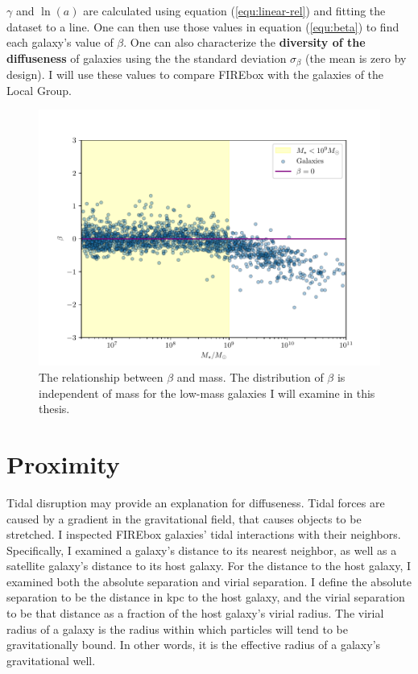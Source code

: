 $\gamma$ and $\ln(a)$ are calculated using equation (\ref{equ:linear-rel}) and fitting the dataset to a line. One can then use those values in equation (\ref{equ:beta}) to find each galaxy's value of $\beta$. One can also characterize the \textbf{diversity of the diffuseness} of galaxies using the the standard deviation $\sigma_\beta$ (the mean is zero by design). I will use these values to compare FIREbox with the galaxies of the Local Group.

\begin{figure}
    \centering
    \includegraphics[width=\textwidth*2/3]{figs/me/beta-mass.pdf}
    \caption{The relationship between $\beta$ and mass. The distribution of $\beta$ is independent of mass for the low-mass galaxies I will examine in this thesis.}
    \label{fig:beta-mass}
\end{figure}

\section{Proximity}


 Tidal disruption may provide an explanation for diffuseness. Tidal forces are caused by a gradient in the gravitational field, that causes objects to be stretched. I inspected FIREbox galaxies' tidal interactions with their neighbors. Specifically, I examined a galaxy's distance to its nearest neighbor, as well as a satellite galaxy's distance to its host galaxy. For the distance to the host galaxy, I examined both the absolute separation and virial separation. I define the absolute separation to be the distance in kpc to the host galaxy, and the virial separation to be that distance as a fraction of the host galaxy's virial radius. The virial radius of a galaxy is the radius within which particles will tend to be gravitationally bound. In other words, it is the effective radius of a galaxy's gravitational well.

